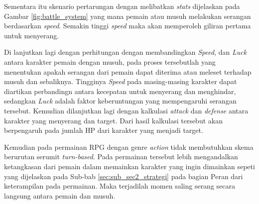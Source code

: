 \begin{subs}
\begin{enumerate}[label=\textbf{\arabic*).}]
		Sementara itu skenario pertarungan dengan melibatkan \textit{stats} dijelaskan pada Gambar \ref{fig:battle_system} yang mana pemain atau musuh melakukan serangan berdasarkan \textit{speed}. Semakin tinggi \textit{speed} maka akan memperoleh giliran pertama untuk menyerang.
		\vspace{1ex}
		
		Di lanjutkan lagi dengan perhitungan dengan membandingkan \textit{Speed}, dan \textit{Luck} antara karakter pemain dengan musuh, pada proses tersebutlah yang menentukan apakah serangan dari pemain dapat diterima atau meleset terhadap musuh dan sebaliknya. Tingginya \textit{Speed} pada masing-masing karakter dapat diartikan perbandingn antara kecepatan untuk menyerang dan menghindar, sedangkan \textit{Luck} adalah faktor keberuntungan yang mempengaruhi serangan tersebut. Kemudian dilanjutkan lagi dengan kalkulasi \textit{attack} dan \textit{defense} antara karakter yang menyerang dan target. Dari hasil kalkulasi tersebut akan berpengaruh pada jumlah HP dari karakter yang menjadi target.
		\vspace{1ex}
		
		Kemudian pada permainan RPG dengan genre \textit{action} tidak membutuhkan skema berurutan serumit \textit{turn-based}. Pada permainan tersebut lebih mengandalkan ketangkasan dari pemain dalam memainkan karakter yang ingin dimainkan sepeti yang dijelaskan pada Sub-bab \ref{sec:sub_sec2_strategi} pada bagian Peran dari keterampilan pada permainan. Maka terjadilah momen saling serang secara langsung antara pemain dan musuh.
		\vspace{1ex}
		

\end{enumerate}
\end{subs}
